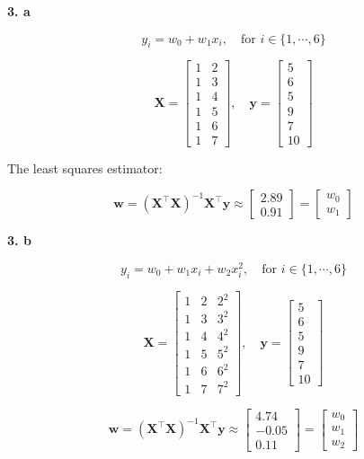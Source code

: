 \documentclass{article}
\begin{document}
\textbf{3. a}

\[
y_i=w_0+w_1x_i,\quad\text{for $i\in\{1,\cdots,6\}$}
\]

\[
\mathbf{X}=
\begin{bmatrix}
1 & 2 \\ 1 & 3 \\ 1 & 4 \\ 1 & 5 \\ 1 & 6 \\ 1 & 7
\end{bmatrix},
\quad
\mathbf{y}=
\begin{bmatrix}
5 \\ 6 \\ 5 \\ 9 \\ 7 \\ 10
\end{bmatrix}
\]

The least squares estimator:

\[
\mathbf{w}=(\mathbf{X}^{\intercal}\mathbf{X})^{-1}\mathbf{X}^{\intercal}\mathbf{y}
\approx
\begin{bmatrix}
2.89 \\ 0.91
\end{bmatrix}=
\begin{bmatrix}
w_0 \\w_1
\end{bmatrix}
\]

\textbf{3. b}

\[
y_i=w_0+w_1x_i+w_2x_i^2,\quad\text{for $i\in\{1,\cdots,6\}$}
\]

\[
\mathbf{X}=
\begin{bmatrix}
1 & 2 & 2^2 \\ 1 & 3 & 3^2 \\ 1 & 4 & 4^2 \\ 1 & 5 & 5^2 \\ 1 & 6 & 6^2 \\ 1 & 7 & 7^2
\end{bmatrix},
\quad
\mathbf{y}=
\begin{bmatrix}
5 \\ 6 \\ 5 \\ 9 \\ 7 \\ 10
\end{bmatrix}
\]

\[
\mathbf{w}=(\mathbf{X}^{\intercal}\mathbf{X})^{-1}\mathbf{X}^{\intercal}\mathbf{y}
\approx
\begin{bmatrix}
4.74 \\ -0.05 \\ 0.11
\end{bmatrix}=
\begin{bmatrix}
w_0 \\w_1 \\ w_2
\end{bmatrix}
\]
\end{document}
